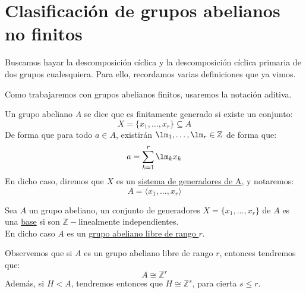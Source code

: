 \section{Clasificación de grupos abelianos no finitos}
\noindent
Buscamos hayar la descomposición cíclica y la descomposición cíclica primaria de dos grupos cualesquiera. Para ello, recordamos varias definiciones que ya vimos.

\begin{notacion}
    Como trabajaremos con grupos abelianos finitos, usaremos la notación aditiva.
\end{notacion}

\begin{definicion}
    Un grupo abeliano $A$ se dice que es finitamente generado si existe un conjunto:
    \begin{equation*}
        X = \{x_1,\ldots,x_r\} \subseteq A
    \end{equation*}
    De forma que para todo $a\in A$, existirán $\lm_1, \ldots, \lm_r \in \mathbb{Z}$ de forma que:
    \begin{equation*}
        a = \sum_{k=1}^{r} \lm_k x_k
    \end{equation*}
    En dicho caso, diremos que $X$ es un \underline{sistema de generadores de A}, y notaremos:
    \begin{equation*}
        A = \langle x_1, \ldots, x_r \rangle 
    \end{equation*}
\end{definicion}

\begin{definicion}[Base]
Sea $A$ un grupo abeliano, un conjunto de generadores $X = \{x_1,\ldots,x_r\}$ de $A$ es una \underline{base} si son $\mathbb{Z}-$linealmente independientes.\\ %

\noindent
En dicho caso $A$ es un \underline{grupo abeliano libre de rango $r$}.
\end{definicion}


\begin{observacion}
    Observemos que si $A$ es un grupo abeliano libre de rango $r$, entonces tendremos que:
    \begin{equation*}
        A \cong \mathbb{Z}^r
    \end{equation*}
    Además, si $H < A$, tendremos entonces que $H\cong \mathbb{Z}^s$, para cierta $s\leq r$.
\end{observacion}

